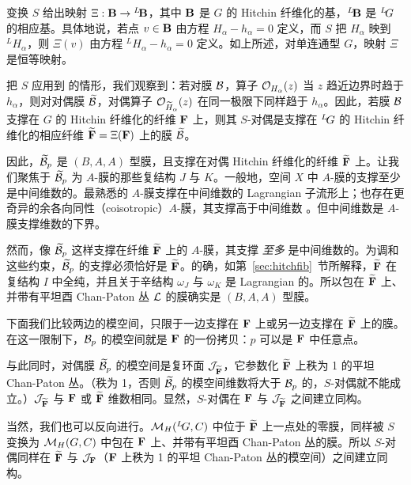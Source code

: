 变换 $S$ 给出映射 $\Xi:{\EUBB}\to {}^L\negthinspace{\EUBB}$，其中 ${\EUBB}$ 是 $G$ 的 Hitchin 纤维化的基，$^L\negthinspace{\EUBB}$ 是 $^L\negthinspace G$ 的相应基。具体地说，若点 $v\in {\EUBB}$ 由方程 $H_\alpha-h_\alpha=0$ 定义，而 $S$ 把 $H_{\alpha}$ 映到 $^LH_{\alpha}$，则 $\Xi(v)$ 由方程 $^LH_\alpha-h_\alpha=0$ 定义。如上所述，对单连通型 $G$，映射 $\Xi$ 是恒等映射。

把 $S$ 应用到 \trampo 的情形，我们观察到：若对膜 ${\cal B}$，算子 ${\EUO}_{H_\alpha}(z)$ 当 $z$ 趋近边界时趋于 $h_\alpha$，则对对偶膜 $\tilde {\cal B}$，对偶算子 ${\EUO}_{\tilde H_\alpha}(z)$ 在同一极限下同样趋于 $h_\alpha$。因此，若膜 ${\cal B}$ 支撑在 $G$ 的 Hitchin 纤维化的纤维 ${\CMF}$ 上，则其 $S$-对偶是支撑在 $^L\negthinspace G$ 的 Hitchin 纤维化的相应纤维 $\tilde {\CMF}=\Xi({\CMF})$ 上的膜 $\tilde {\cal B}$。

因此，$\tilde{\cal B}_p$ 是 $(B,A,A)$ 型膜，且支撑在对偶 Hitchin 纤维化的纤维 $\tilde {\CMF}$ 上。让我们聚焦于 $\tilde{\cal B}_p$ 为 $A$-膜的那些复结构 $J$ 与 $K$。一般地，空间 $X$ 中 $A$-膜的支撑至少是中间维数的。最熟悉的 $A$-膜支撑在中间维数的 Lagrangian 子流形上；也存在更奇异的余各向同性（coisotropic）$A$-膜，其支撑高于中间维数 \cite{ref80}。但中间维数是 $A$-膜支撑维数的下界。

然而，像 $\tilde {\cal B}_p$ 这样支撑在纤维 $\tilde {\CMF}$ 上的 $A$-膜，其支撑 {\it 至多} 是中间维数的。为调和这些约束，$\tilde{\cal B}_p$ 的支撑必须恰好是 $\tilde {\CMF}$。的确，如第~\ref{sec:hitchfib}~节所解释，$\tilde {\CMF}$ 在复结构 $I$ 中全纯，并且关于辛结构 $\omega_J$ 与 $\omega_K$ 是 Lagrangian 的。所以包在 $\tilde {\CMF}$ 上、并带有平坦酉 Chan-Paton 丛 ${\cal L}$ 的膜确实是 $(B,A,A)$ 型膜。

下面我们比较两边的模空间，只限于一边支撑在 ${\CMF}$ 上或另一边支撑在 $\tilde {\CMF}$ 上的膜。在这一限制下，${\cal B}_p$ 的模空间就是 ${\CMF}$ 的一份拷贝：$p$ 可以是 ${\CMF}$ 中任意点。

与此同时，对偶膜 $\tilde{\cal B}_p$ 的模空间是复环面 ${\EUJ}_{\tilde {\CMF}}$，它参数化 $\tilde {\CMF}$ 上秩为 1 的平坦 Chan-Paton 丛。（秩为 1，否则 $\tilde{\cal B}_p$ 的模空间维数将大于 ${\cal B}_p$ 的，$S$-对偶就不能成立。）${\EUJ}_{\tilde {\CMF}}$ 与 ${\CMF}$ 或 $\tilde {\CMF}$ 维数相同。显然，$S$-对偶在 ${\CMF}$ 与 ${\EUJ}_{\tilde {\CMF}}$ 之间建立同构。

当然，我们也可以反向进行。$\MH(^L\negthinspace G,C)$ 中位于 $\tilde {\CMF}$ 上一点处的零膜，同样被 $S$ 变换为 $\MH(G,C)$ 中包在 ${\CMF}$ 上、并带有平坦酉 Chan-Paton 丛的膜。所以 $S$-对偶同样在 $\tilde {\CMF}$ 与 ${\EUJ}_{\CMF}$（${\CMF}$ 上秩为 1 的平坦 Chan-Paton 丛的模空间）之间建立同构。

